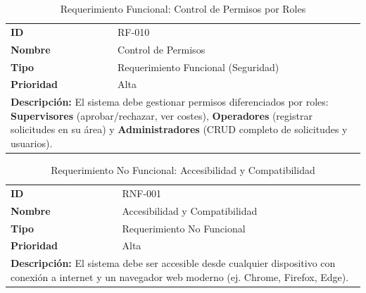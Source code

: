 \documentclass[12pt,letterpaper,spanish]{report}
\begin{document}
\begin{table}[H]
    \centering
    \caption{Requerimiento Funcional: Control de Permisos por Roles}
    \label{tab:rf010}
    \begin{tabular}{ll}
        \toprule
        \textbf{ID} & RF-010 \\
        \textbf{Nombre} & Control de Permisos \\
        \textbf{Tipo} & Requerimiento Funcional (Seguridad) \\
        \textbf{Prioridad} & Alta \\
        \midrule
        \multicolumn{2}{l}{
            \parbox{0.9\linewidth}{
                \textbf{Descripción:} El sistema debe gestionar permisos diferenciados por roles: \textbf{Supervisores} (aprobar/rechazar, ver costes), \textbf{Operadores} (registrar solicitudes en su área) y \textbf{Administradores} (CRUD completo de solicitudes y usuarios).
            }
        } \\
        \bottomrule
    \end{tabular}
\end{table}



\begin{table}[H]
    \centering
    \caption{Requerimiento No Funcional: Accesibilidad y Compatibilidad}
    \label{tab:rnf001}
    \begin{tabular}{ll}
        \toprule
        \textbf{ID} & RNF-001 \\
        \textbf{Nombre} & Accesibilidad y Compatibilidad \\
        \textbf{Tipo} & Requerimiento No Funcional \\
        \textbf{Prioridad} & Alta \\
        \midrule
        \multicolumn{2}{l}{
            \parbox{0.9\linewidth}{
                \textbf{Descripción:} El sistema debe ser accesible desde cualquier dispositivo con conexión a internet y un navegador web moderno (ej. Chrome, Firefox, Edge).
            }
        } \\
        \bottomrule
    \end{tabular}
\end{table}
\end{document}
